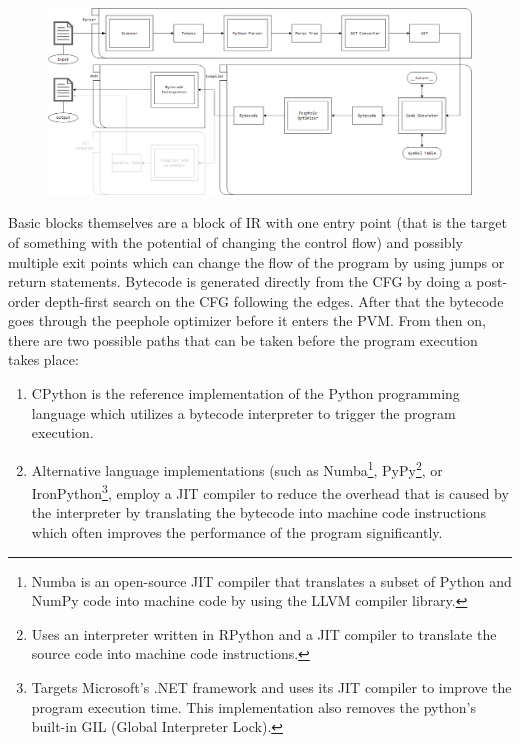 \begin{figure}[h]
    \centering
    \includegraphics[width=1\textwidth]{images/PythonArchitecture.png}
\end{figure}

Basic blocks themselves are a block of IR with one entry point (that is the target
of something with the potential of changing the control flow) and possibly multiple
exit points which can change the flow of the program by using jumps or return
statements. Bytecode is generated directly from the CFG by doing a post-order
depth-first search on the CFG following the edges. After that the bytecode goes
through the peephole optimizer before it enters the PVM. From then on, there are
two possible paths that can be taken before the program execution takes place:

\begin{enumerate}
    \item CPython is the reference implementation of the Python programming language
    which utilizes a bytecode interpreter to trigger the program execution.
    \item Alternative language implementations (such as Numba\footnote{Numba is
    an open-source JIT compiler that translates a subset of Python and NumPy code
    into machine code by using the LLVM compiler library.}, PyPy\footnote{Uses an
    interpreter written in RPython and a JIT compiler to translate the source code
    into machine code instructions.}, or IronPython\footnote{Targets Microsoft's
    .NET framework and uses its JIT compiler to improve the program execution time.
    This implementation also removes the python's built-in GIL (Global Interpreter
    Lock).}, employ a JIT compiler to reduce the overhead that is caused by the
    interpreter by translating the bytecode into machine code instructions which
    often improves the performance of the program significantly.
\end{enumerate}

